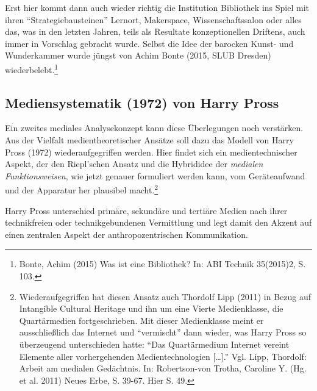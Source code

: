 \documentclass[a4paper,
fontsize=11pt,
oneside,
numbers=noperiodatend,
parskip=half-,
bibliography=totoc,
final
]{scrartcl}
\begin{document}
Erst hier kommt dann auch wieder richtig die Institution Bibliothek ins
Spiel mit ihren \enquote{Strategiebausteinen} Lernort, Makerspace,
Wissenschaftssalon oder alles das, was in den letzten Jahren, teils als
Resultate konzeptionellen Driftens, auch immer in Vorschlag gebracht
wurde. Selbst die Idee der barocken Kunst- und Wunderkammer wurde jüngst
von Achim Bonte (2015, SLUB Dresden) wiederbelebt.\footnote{Bonte, Achim
  (2015) Was ist eine Bibliothek? In: ABI Technik 35(2015)2, S. 103.}

\subsection*{Mediensystematik (1972) von Harry
Pross}\label{mediensystematik-1972-von-harry-pross}

Ein zweites mediales Analysekonzept kann diese Überlegungen noch
verstärken. Aus der Vielfalt medientheoretischer Ansätze soll dazu das
Modell von Harry Pross (1972) wiederaufgegriffen werden. Hier findet
sich ein medientechnischer Aspekt, der den Riepl'schen Ansatz und die
Hybrididee der \emph{medialen Funktionsweisen}, wie jetzt genauer
formuliert werden kann, vom Geräteaufwand und der Apparatur her
plausibel macht.\footnote{Wiederaufgegriffen hat diesen Ansatz auch
  Thordolf Lipp (2011) in Bezug auf Intangible Cultural Heritage und ihn
  um eine Vierte Medienklasse, die Quartärmedien fortgeschrieben. Mit
  dieser Medienklasse meint er ausschließlich das Internet und
  \enquote{vermischt} dann wieder, was Harry Pross so überzeugend
  unterschieden hatte: \enquote{Das Quartärmedium Internet vereint
  Elemente aller vorhergehenden Medientechnologien {[}\ldots{}{]}.} Vgl.
  Lipp, Thordolf: Arbeit am medialen Gedächtnis. In: Robertson-von
  Trotha, Caroline Y. (Hg. et al. 2011) Neues Erbe, S. 39-67. Hier S.
  49.}

Harry Pross unterschied primäre, sekundäre und tertiäre Medien nach
ihrer technikfreien oder technikgebundenen Vermittlung und legt damit
den Akzent auf einen zentralen Aspekt der anthropozentrischen
Kommunikation.
\end{document}
